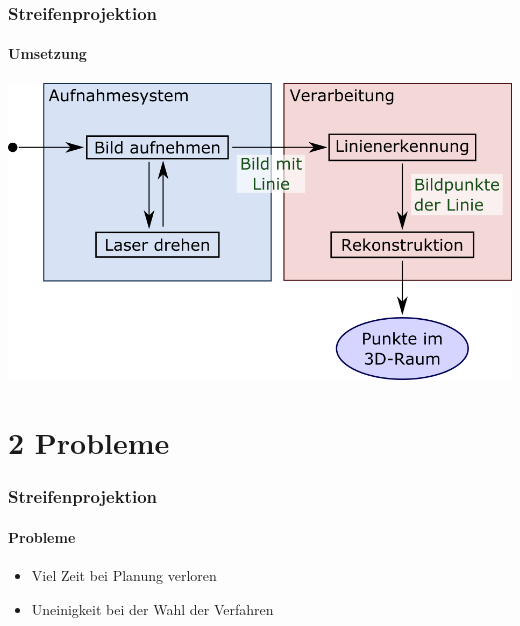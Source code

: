 \documentclass{beamer}
\begin{document}
\begin{frame}
	\frametitle{Streifenprojektion}
	\framesubtitle{Umsetzung}

	
	\includegraphics[width=\linewidth]{includes/blockbild.png}

\end{frame}


\section{2 \hspace{5px} Probleme}
\begin{frame}
	\frametitle{Streifenprojektion}
	\framesubtitle{Probleme}

	\begin{itemize}
		\item Viel Zeit bei Planung verloren
		\item Uneinigkeit bei der Wahl der Verfahren
	\end{itemize}

\end{frame}
\end{document}
